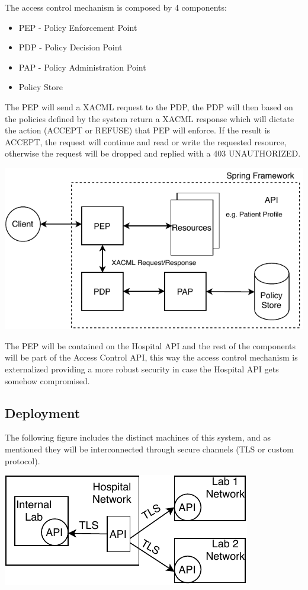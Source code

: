 The access control mechanism is composed by 4 components:
\begin{itemize}
	\item PEP - Policy Enforcement Point
	\item PDP - Policy Decision Point
	\item PAP - Policy Administration Point
	\item Policy Store
\end{itemize}

The PEP will send a XACML\cite{xacml} request to the PDP, the PDP will then based on the policies defined by the system return a XACML response which will dictate the action (ACCEPT or REFUSE) that PEP will enforce. If the result is ACCEPT, the request will continue and read or write the requested resource, otherwise the request will be dropped and replied with a 403 UNAUTHORIZED.

	\includegraphics[width=.6\textwidth]{figs/access_control.pdf}


The PEP will be contained on the Hospital API and the rest of the components will be part of the Access Control API, this way the access control mechanism is externalized providing a more robust security in case the Hospital API gets somehow compromised. \\

\subsection{Deployment}
The following figure includes the distinct machines of this system, and as mentioned they will be interconnected through secure channels (TLS or custom protocol).

	\includegraphics[width=.4\textwidth]{figs/infrastructure.pdf}

